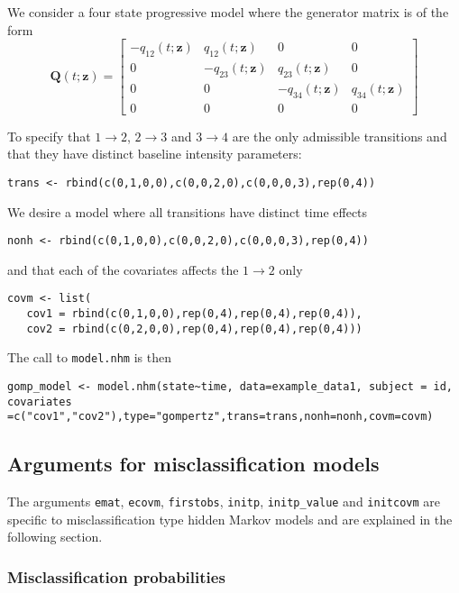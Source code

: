 \documentclass{article}
\numberwithin{equation}{section}
\begin{document}
We consider a four state progressive model where the generator matrix is of the form
$$\mathbf{Q}(t; \mathbf{z}) = \begin{bmatrix} -q_{12}(t  ; \mathbf{z}) & q_{12}(t  ; \mathbf{z}) & 0 & 0 \\
0 & -q_{23}(t ; \mathbf{z}) & q_{23}(t ; \mathbf{z}) & 0 \\
0 & 0 &-q_{34}(t ; \mathbf{z}) & q_{34}(t ; \mathbf{z}) \\
0 & 0 & 0 & 0 \end{bmatrix}$$

To specify that $1 \rightarrow 2$, $2 \rightarrow 3$ and $3 \rightarrow 4$ are the only admissible transitions and that they have distinct baseline intensity parameters:
\begin{verbatim}
trans <- rbind(c(0,1,0,0),c(0,0,2,0),c(0,0,0,3),rep(0,4))
\end{verbatim}

We desire a model where all transitions have distinct time effects

\begin{verbatim}
nonh <- rbind(c(0,1,0,0),c(0,0,2,0),c(0,0,0,3),rep(0,4))
\end{verbatim}

and that each of the covariates affects the $1 \rightarrow 2$ only

\begin{verbatim}
covm <- list(
   cov1 = rbind(c(0,1,0,0),rep(0,4),rep(0,4),rep(0,4)),
   cov2 = rbind(c(0,2,0,0),rep(0,4),rep(0,4),rep(0,4)))
\end{verbatim}

The call to \verb!model.nhm! is then

\begin{verbatim}
gomp_model <- model.nhm(state~time, data=example_data1, subject = id, covariates
=c("cov1","cov2"),type="gompertz",trans=trans,nonh=nonh,covm=covm)
\end{verbatim}

\subsection{Arguments for misclassification models}

The arguments \verb!emat!, \verb!ecovm!, \verb!firstobs!, \verb!initp!, \verb!initp_value! and \verb!initcovm! are specific to misclassification type hidden Markov models and are explained in the following section.

\subsubsection{Misclassification probabilities}
\end{document}
